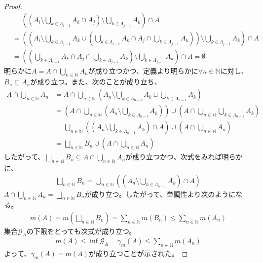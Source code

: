\documentclass[dvipdfmx]{jsarticle}
\begin{document}
\begin{proof}
\begin{align*}
&= \left( \left( A_{i} \setminus \bigcup_{k \in \varLambda_{i - 1}} A_{k} \cap A_{j} \right) \setminus \bigcup_{k \in \varLambda_{j - 1}} A_{k} \right) \cap A\\
&= \left( \left( A_{i} \setminus \bigcup_{k \in \varLambda_{j - 1}} A_{k} \cup \left( \bigcup_{k \in \varLambda_{i - 1}} A_{k} \cap A_{j} \cap \bigcup_{k \in \varLambda_{j - 1}} A_{k} \right) \right) \setminus \bigcup_{k \in \varLambda_{j - 1}} A_{k} \right) \cap A\\
&= \left( \left( \bigcup_{k \in \varLambda_{i - 1}} A_{k} \cap A_{j} \cap \bigcup_{k \in \varLambda_{j - 1}} A_{k} \right) \setminus \bigcup_{k \in \varLambda_{j - 1}} A_{k} \right) \cap A = \emptyset
\end{align*}
明らかに$A = A \cap \bigcup_{n \in \mathbb{N}} A_{n}$が成り立つかつ、定義より明らかに$\forall n \in \mathbb{N}$に対し、$B_{n} \subseteq A_{n}$が成り立つ。また、次のことが成り立ち、
\begin{align*}
A \cap \bigcup_{n \in \mathbb{N}} A_{n} &= A \cap \bigcup_{n \in \mathbb{N}} \left( A_{n} \setminus \bigcup_{k \in \varLambda_{n - 1}} A_{k} \sqcup \bigcup_{k \in \varLambda_{n - 1}} A_{k} \right)\\
&= \left( A \cap \bigcup_{n \in \mathbb{N}} \left( A_{n} \setminus \bigcup_{k \in \varLambda_{n - 1}} A_{k} \right) \right) \cup \left( A \cap \bigcup_{n \in \mathbb{N}} {\bigcup_{k \in \varLambda_{n - 1}} A_{k}} \right)\\
&= \bigcup_{n \in \mathbb{N}} \left( \left( A_{n} \setminus \bigcup_{k \in \varLambda_{n - 1}} A_{k} \right) \cap A \right) \cup \left( A \cap \bigcup_{n \in \mathbb{N}} A_{n} \right)\\
&= \bigsqcup_{n \in \mathbb{N}} B_{n} \cup \left( A \cap \bigcup_{n \in \mathbb{N}} A_{n} \right)
\end{align*}
したがって、$\bigsqcup_{n \in \mathbb{N}} B_{n} \subseteq A \cap \bigcup_{n \in \mathbb{N}} A_{n}$が成り立つかつ、次式をみれば明らかに、
\begin{align*}
\bigsqcup_{n \in \mathbb{N}} B_{n} = \bigcup_{n \in \mathbb{N}} \left( \left( A_{n} \setminus \bigcup_{k \in \varLambda_{n - 1}} A_{k} \right) \cap A \right)
\end{align*}
$A \cap \bigcup_{n \in \mathbb{N}} A_{n} = \bigsqcup_{n \in \mathbb{N}} B_{n}$が成り立つ。したがって、単調性より次のようになる。
\begin{align*}
m(A) = m\left( \bigsqcup_{n \in \mathbb{N}} B_{n} \right) = \sum_{n \in \mathbb{N}} {m\left( B_{n} \right)} \leq \sum_{n \in \mathbb{N}} {m\left( A_{n} \right)}
\end{align*}
集合$\mathcal{G}_{A}$の下限をとっても次式が成り立つ。
\begin{align*}
m(A) \leq \inf\mathcal{G}_{A} = \gamma_{m}(A) \leq \sum_{n \in \mathbb{N}} {m\left( A_{n} \right)}
\end{align*}
よって、$\gamma_{m}(A) = m(A)$が成り立つことが示された。
\end{proof}
\end{document}
